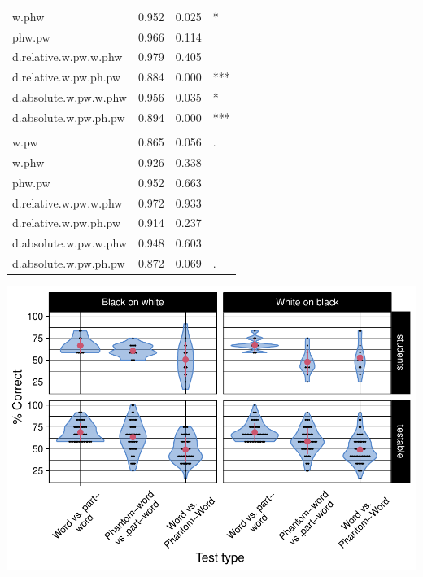 \documentclass[
]{article}
\begin{document}
\begin{table}
\begin{tabular}[t]{lrrl}
\hspace{1em}w.phw & 0.952 & 0.025 & *\\
\hspace{1em}phw.pw & 0.966 & 0.114 & \\
\hspace{1em}d.relative.w.pw.w.phw & 0.979 & 0.405 & \\
\hspace{1em}d.relative.w.pw.ph.pw & 0.884 & 0.000 & ***\\
\hspace{1em}d.absolute.w.pw.w.phw & 0.956 & 0.035 & *\\
\hspace{1em}d.absolute.w.pw.ph.pw & 0.894 & 0.000 & ***\\
\addlinespace[0.3em]
\multicolumn{4}{l}{\textbf{students - white.on.black}}\\
\hspace{1em}w.pw & 0.865 & 0.056 & .\\
\hspace{1em}w.phw & 0.926 & 0.338 & \\
\hspace{1em}phw.pw & 0.952 & 0.663 & \\
\hspace{1em}d.relative.w.pw.w.phw & 0.972 & 0.933 & \\
\hspace{1em}d.relative.w.pw.ph.pw & 0.914 & 0.237 & \\
\hspace{1em}d.absolute.w.pw.w.phw & 0.948 & 0.603 & \\
\hspace{1em}d.absolute.w.pw.ph.pw & 0.872 & 0.069 & .\\
\bottomrule
\end{tabular}
\end{table}

\begin{center}\includegraphics[width=0.8\linewidth]{vsl_phamtoms_simultaneous_results_files/figure-latex/vsl-simultaneous-fa-plot-accuracy-1} \end{center}
\end{document}
